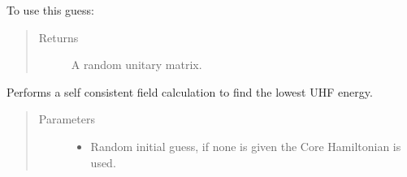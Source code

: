 \documentclass[letterpaper,10pt,english]{sphinxmanual}
\begin{document}
\begin{fulllineitems}
\begin{fulllineitems}
To use this guess:

\begin{sphinxVerbatim}[commandchars=\\\{\}]
   
          
   
  
\end{sphinxVerbatim}
\begin{quote}\begin{description}
\item[{Returns}] \leavevmode
A random unitary matrix.

\end{description}\end{quote}

\end{fulllineitems}


\begin{fulllineitems}
\label{\detokenize{cUHF_s:hf.HartreeFock.cUHF_s.MF.scf}}
Performs a self consistent field calculation to find the lowest UHF energy.
\begin{quote}\begin{description}
\item[{Parameters}] \leavevmode\begin{itemize}
\item {} 
 \textendash{} Random initial guess, if none is given the Core Hamiltonian is used.


\end{itemize}
\end{description}
\end{quote}
\end{fulllineitems}
\end{fulllineitems}
\end{document}
